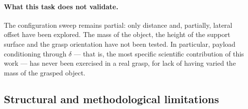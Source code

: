 \documentclass[a4paper, oneside]{article}
\begin{document}
\paragraph{What this task does not validate.} The configuration sweep remains
partial: only distance and, partially, lateral offset have been explored. The
mass of the object, the height of the support surface and the grasp orientation
have not been tested. In particular, payload conditioning through $\delta$ ---
that is, the most specific scientific contribution of this work --- has never
been exercised in a real grasp, for lack of having varied the mass of the
grasped object.

\subsection{Structural and methodological limitations}
\label{sec-limites}
\end{document}
